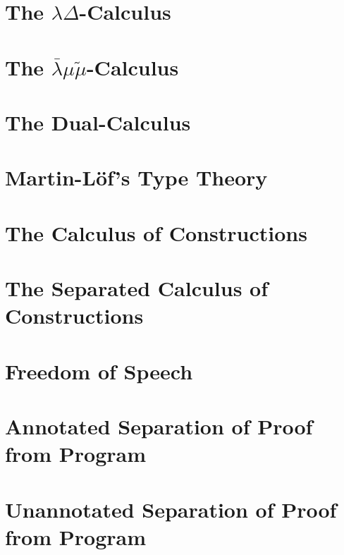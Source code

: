 \documentclass[phd,appendix,dedicationpage,ackpage,epigraphpage]{uithesis}
\newcommand{\LBMMT}[0]{\bar{\lambda}\mu\tilde\mu}
\begin{document}
\newpage
\section{The $\lambda\Delta$-Calculus}
\label{sec:lamd_all}
\Lamdall{}

\newpage
\section{The $\LBMMT$-Calculus}
\label{sec:lbmmt_all}
\LBMMTall{}

\newpage
\section{The Dual-Calculus}
\label{sec:dc_all}
\DCall{}

\newpage
\section{Martin-L\"of's Type Theory}
\label{sec:tt_all}
\TTall{}

\newpage
\section{The Calculus of Constructions}
\label{sec:coc_all}
\CoCall{}

\newpage
\section{The Separated Calculus of Constructions}
\label{sec:coc_sep_all}
\CoCSall{}

\newpage
\section{Freedom of Speech}
\label{sec:freedom_of_speech}
\FSall{}

\newpage
\section{Annotated Separation of Proof from Program}
\label{sec:annotated_separation_of_proof_from_program}
\Sepall{}

\newpage
\section{Unannotated Separation of Proof from Program}
\label{sec:unannotated_separation_of_proof_from_program}
\SepUall{}



\end{document}
